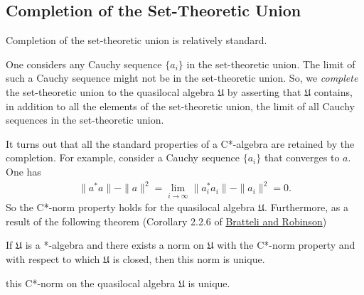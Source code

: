 \subsection{Completion of the Set-Theoretic Union}\label{subsec:completion-of-the-set-theoretic-union}
Completion of the set-theoretic union is relatively standard.

One considers any Cauchy sequence $\{a_i\}$ in the set-theoretic union. The limit of such a Cauchy sequence might not be in the set-theoretic union. So, we \textit{complete} the set-theoretic union to the quasilocal algebra $\mathfrak{U}$ by asserting that $\mathfrak{U}$ contains, in addition to all the elements of the set-theoretic union, the limit of all Cauchy sequences in the set-theoretic union.

It turns out that all the standard properties of a C*-algebra are retained by the completion. For example, consider a Cauchy sequence $\{a_i\}$ that converges to $a$. One has
\begin{align}
\|a^*a\| - \|a\|^2 = \lim\limits_{i \rightarrow \infty} \|a_i^*a_i\| - \|a_i\|^2 = 0.
\end{align}
So the C*-norm property holds for the quasilocal algebra $\mathfrak{U}$. Furthermore, as a result of the following theorem (Corollary 2.2.6 of \href{https://doi.org/10.1007/978-3-662-02520-8}{Bratteli and Robinson})
\begin{theorem}
If $\mathfrak{U}$ is a *-algebra and there exists a norm on $\mathfrak{U}$ with the C*-norm property and with respect to which $\mathfrak{U}$ is closed, then this norm is unique.
\end{theorem}
\noindent this C*-norm on the quasilocal algebra $\mathfrak{U}$ is unique.
